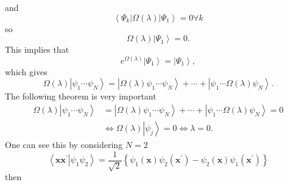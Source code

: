 \documentclass[aps,preprint]{revtex4}%
\begin{document}
and
\begin{equation}
\left\langle \Psi_{k}\right\vert \Omega\left(  \lambda\right)  \left\vert
\Psi_{1}\right\rangle =0\forall k
\end{equation}
so
\begin{equation}
\Omega\left(  \lambda\right)  \left\vert \Psi_{1}\right\rangle =0.
\end{equation}
This implies that
\begin{equation}
e^{\Omega\left(  \lambda\right)  }\left\vert \Psi_{1}\right\rangle =\left\vert
\Psi_{1}\right\rangle ,
\end{equation}
which gives
\begin{equation}
\Omega\left(  \lambda\right)  \left\vert \psi_{1}\cdots\psi_{N}\right\rangle
=\left\vert \Omega\left(  \lambda\right)  \psi_{1}\cdots\psi_{N}\right\rangle
+\cdots+\left\vert \psi_{1}\cdots\Omega\left(  \lambda\right)  \psi
_{N}\right\rangle .
\end{equation}
The following theorem is very important%
\begin{align}
\Omega\left(  \lambda\right)  \left\vert \psi_{1}\cdots\psi_{N}\right\rangle
& =\left\vert \Omega\left(  \lambda\right)  \psi_{1}\cdots\psi_{N}%
\right\rangle +\cdots+\left\vert \psi_{1}\cdots\Omega\left(  \lambda\right)
\psi_{N}\right\rangle =0\nonumber\\
& \Leftrightarrow\Omega\left(  \lambda\right)  \left\vert \psi_{j}%
\right\rangle =0\Leftrightarrow\lambda=0.
\end{align}
One can see this by considering $N=2$
\begin{equation}
\left\langle \left.  \mathbf{xx}^{\prime}\right\vert \psi_{1}\psi
_{2}\right\rangle =\frac{1}{\sqrt{2}}\left\{  \psi_{1}\left(  \mathbf{x}%
\right)  \psi_{2}\left(  \mathbf{x}^{\prime}\right)  -\psi_{2}\left(
\mathbf{x}\right)  \psi_{1}\left(  \mathbf{x}^{\prime}\right)  \right\}
\end{equation}
then%
\end{document}
